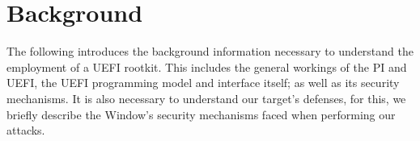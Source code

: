 
\chapter{Background}

The following introduces the background information necessary to understand the employment of a \ac{UEFI} rootkit. This includes the general workings of the \acf{PI} and \ac{UEFI}, the \ac{UEFI} programming model and interface itself; as well as its security mechanisms. It is also necessary to understand our target's defenses, for this, we briefly describe the Window's security mechanisms faced when performing our attacks.



